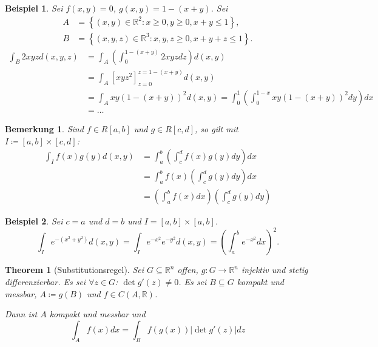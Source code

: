 \documentclass[12pt]{extreport} %
\newcommand{\R}{\mathbb{R}}
\theoremstyle{named}
\newtheorem{unnamedtheorem}{Theorem} \counterwithin{unnamedtheorem}{chapter}
\theoremstyle{nnamed}
\theoremstyle{itshape}
\theoremstyle{normal}
\newtheorem*{beispiel*}{Beispiel}
\newtheorem*{bemerkung}{Bemerkung}
\begin{document}
\begin{beispiel*} Sei $f(x,y) = 0$, $g(x,y) = 1 - (x+y)$. Sei
	\begin{align*}
		A & = \left\{ (x,y) \in \R^{2} \colon x \geq 0, y \geq 0, x + y \leq 1 \right\}, \\
		B & = \left\{ (x,y,z) \in \R^{3} \colon x,y,z \geq 0, x + y + z \leq 1 \right\}.
	\end{align*}  %
	\begin{align*}
		\int_{B} 2 xyz d(x,y,z) & = \int_{A} \left( \int_{0}^{1 - (x+y)} 2xyz dz \right) d(x,y) \\
		& = \int_{A} \left[ xyz^{2} \right]_{z=0}^{z=1-(x+y)} d(x,y) \\
		& = \int_{A} xy \left( 1 - (x+y)\right)^{2} d(x,y) = \int_{0}^{1} \left( \int_{0}^{1-x} xy \left( 1 - (x+y)\right)^{2} dy \right) dx \\
		& = \dotsc 
	\end{align*} 
\end{beispiel*}


\begin{bemerkung}
	Sind $f \in R[a,b]$ und $g \in R[c,d]$, so gilt mit $I \coloneqq [a,b] \times [c,d]$:
	\begin{align*}
		\int_{I} f(x) g(y) d(x,y) & = \int_{a}^{b} \left( \int_{c}^{d} f(x) g(y) dy \right) dx \\
		& = \int_{a}^{b} f(x) \left( \int_{c}^{d} g(y) dy \right) dx \\
		& = \left( \int_{a}^{b} f(x) dx \right) \left( \int_{c}^{d} g(y) dy \right) 
	\end{align*} 	
\end{bemerkung}


\begin{beispiel*}
	Sei $c = a$ und $d = b$ und $I = [a, b] \times [a, b]$.
	$$ \int_{I} e^{-(x^{2} + y^{2})} d(x,y) = \int_{I} e^{-x^{2}} e^{-y^{2}} d(x,y) = \left( \int_{a}^{b} e^{-x^{2}} dx \right)^{2}. $$
\end{beispiel*}

\begin{unnamedtheorem}[Substitutionsregel] \label{20.7:satz}
	Sei $G \subseteq \R^{n}$ offen, $g \colon G \rightarrow \R^{n}$ injektiv und stetig differenzierbar. Es sei $\forall z \in G$: $\det g'(z) \neq 0$. Es sei $B \subseteq G$ kompakt und messbar, $A \coloneqq g(B)$ und $f \in C(A, \R)$. %
	
	\bigskip
	
	Dann ist $A$ kompakt und messbar und
	$$ \int_{A} f(x) dx = \int_{B} f\left( g(x) \right) \left| \det g'(z) \right| dz $$
\end{unnamedtheorem}
\end{document}
